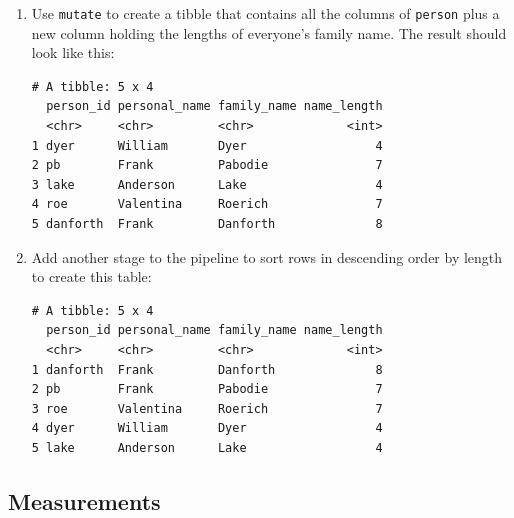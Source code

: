\begin{enumerate}
\item
  Use \texttt{mutate} to create a tibble that contains all the columns of \texttt{person}
  plus a new column holding the lengths of everyone's family name.
  The result should look like this:

\begin{lstlisting}
# A tibble: 5 x 4
  person_id personal_name family_name name_length
  <chr>     <chr>         <chr>             <int>
1 dyer      William       Dyer                  4
2 pb        Frank         Pabodie               7
3 lake      Anderson      Lake                  4
4 roe       Valentina     Roerich               7
5 danforth  Frank         Danforth              8
\end{lstlisting}

\item
  Add another stage to the pipeline to sort rows in descending order by length to create this table:

\begin{lstlisting}
# A tibble: 5 x 4
  person_id personal_name family_name name_length
  <chr>     <chr>         <chr>             <int>
1 danforth  Frank         Danforth              8
2 pb        Frank         Pabodie               7
3 roe       Valentina     Roerich               7
4 dyer      William       Dyer                  4
5 lake      Anderson      Lake                  4
\end{lstlisting}

\end{enumerate}

\subsection*{Measurements}

